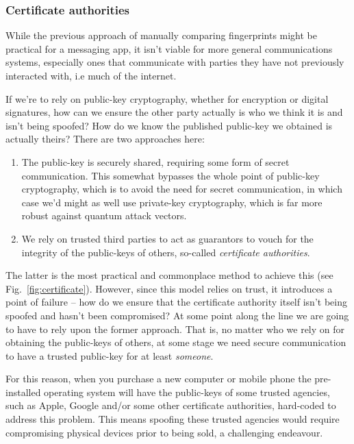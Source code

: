 \subsubsection{Certificate authorities} \label{certificate-authorities}

While the previous approach of manually comparing fingerprints might be practical for a messaging app, it isn't viable for more general communications systems, especially ones that communicate with parties they have not previously interacted with, i.e much of the internet.

If we're to rely on public-key cryptography, whether for encryption or digital signatures, how can we ensure the other party actually is who we think it is and isn't being spoofed? How do we know the published public-key we obtained is actually theirs? There are two approaches here:
\begin{enumerate}
\item The public-key is securely shared, requiring some form of secret communication. This somewhat bypasses the whole point of public-key cryptography, which is to avoid the need for secret communication, in which case we'd might as well use private-key cryptography, which is far more robust against quantum attack vectors.
\item We rely on trusted third parties to act as guarantors to vouch for the integrity of the public-keys of others, so-called \emph{certificate authorities}.
\end{enumerate}

The latter is the most practical and commonplace method to achieve this (see Fig.~\ref{fig:certificate}). However, since this model relies on trust, it introduces a point of failure -- how do we ensure that the certificate authority itself isn't being spoofed and hasn't been compromised? At some point along the line we are going to have to rely upon the former approach. That is, no matter who we rely on for obtaining the public-keys of others, at some stage we need secure communication to have a trusted public-key for at least \emph{someone}.

For this reason, when you purchase a new computer or mobile phone the pre-installed operating system will have the public-keys of some trusted agencies, such as Apple, Google and/or some other certificate authorities, hard-coded to address this problem. This means spoofing these trusted agencies would require compromising physical devices prior to being sold, a challenging endeavour.

